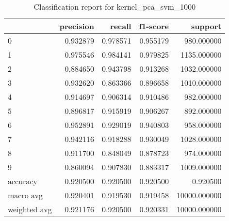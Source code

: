 \begin{table}[htb!]
\centering
\caption{Classification report for kernel_pca_svm_1000}
\label{tab:classification-report-kernel_pca_svm_1000}
\begin{tabular}{lrrrr}
\toprule
 & precision & recall & f1-score & support \\
\midrule
0 & 0.932879 & 0.978571 & 0.955179 & 980.000000 \\
1 & 0.975546 & 0.984141 & 0.979825 & 1135.000000 \\
2 & 0.884650 & 0.943798 & 0.913268 & 1032.000000 \\
3 & 0.932620 & 0.863366 & 0.896658 & 1010.000000 \\
4 & 0.914697 & 0.906314 & 0.910486 & 982.000000 \\
5 & 0.896817 & 0.915919 & 0.906267 & 892.000000 \\
6 & 0.952891 & 0.929019 & 0.940803 & 958.000000 \\
7 & 0.942116 & 0.918288 & 0.930049 & 1028.000000 \\
8 & 0.911700 & 0.848049 & 0.878723 & 974.000000 \\
9 & 0.860094 & 0.907830 & 0.883317 & 1009.000000 \\
accuracy & 0.920500 & 0.920500 & 0.920500 & 0.920500 \\
macro avg & 0.920401 & 0.919530 & 0.919458 & 10000.000000 \\
weighted avg & 0.921176 & 0.920500 & 0.920331 & 10000.000000 \\
\bottomrule
\end{tabular}
\end{table}
